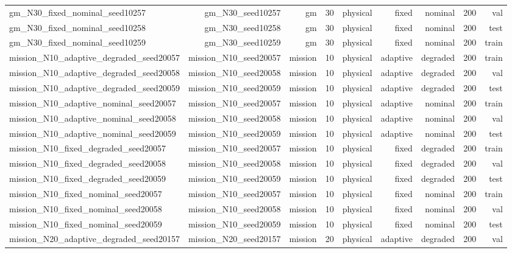 \begin{tabular}{lrrrrrrrr}
gm\_N30\_fixed\_nominal\_seed10257 & gm\_N30\_seed10257 & gm & 30 & physical & fixed & nominal & 200 & val \\
gm\_N30\_fixed\_nominal\_seed10258 & gm\_N30\_seed10258 & gm & 30 & physical & fixed & nominal & 200 & test \\
gm\_N30\_fixed\_nominal\_seed10259 & gm\_N30\_seed10259 & gm & 30 & physical & fixed & nominal & 200 & train \\
mission\_N10\_adaptive\_degraded\_seed20057 & mission\_N10\_seed20057 & mission & 10 & physical & adaptive & degraded & 200 & train \\
mission\_N10\_adaptive\_degraded\_seed20058 & mission\_N10\_seed20058 & mission & 10 & physical & adaptive & degraded & 200 & val \\
mission\_N10\_adaptive\_degraded\_seed20059 & mission\_N10\_seed20059 & mission & 10 & physical & adaptive & degraded & 200 & test \\
mission\_N10\_adaptive\_nominal\_seed20057 & mission\_N10\_seed20057 & mission & 10 & physical & adaptive & nominal & 200 & train \\
mission\_N10\_adaptive\_nominal\_seed20058 & mission\_N10\_seed20058 & mission & 10 & physical & adaptive & nominal & 200 & val \\
mission\_N10\_adaptive\_nominal\_seed20059 & mission\_N10\_seed20059 & mission & 10 & physical & adaptive & nominal & 200 & test \\
mission\_N10\_fixed\_degraded\_seed20057 & mission\_N10\_seed20057 & mission & 10 & physical & fixed & degraded & 200 & train \\
mission\_N10\_fixed\_degraded\_seed20058 & mission\_N10\_seed20058 & mission & 10 & physical & fixed & degraded & 200 & val \\
mission\_N10\_fixed\_degraded\_seed20059 & mission\_N10\_seed20059 & mission & 10 & physical & fixed & degraded & 200 & test \\
mission\_N10\_fixed\_nominal\_seed20057 & mission\_N10\_seed20057 & mission & 10 & physical & fixed & nominal & 200 & train \\
mission\_N10\_fixed\_nominal\_seed20058 & mission\_N10\_seed20058 & mission & 10 & physical & fixed & nominal & 200 & val \\
mission\_N10\_fixed\_nominal\_seed20059 & mission\_N10\_seed20059 & mission & 10 & physical & fixed & nominal & 200 & test \\
mission\_N20\_adaptive\_degraded\_seed20157 & mission\_N20\_seed20157 & mission & 20 & physical & adaptive & degraded & 200 & val \\

\end{tabular}
